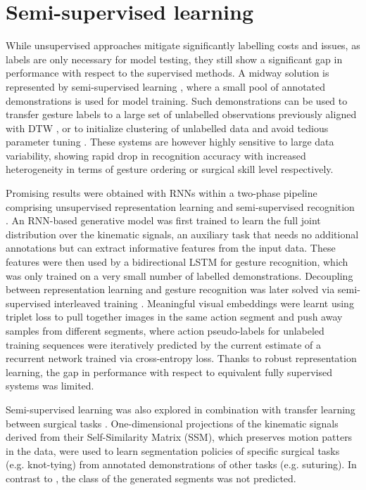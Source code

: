 \documentclass[journal]{IEEEtran}
\begin{document}
\section{Semi-supervised learning} \label{Semi-supervised Learning}

While unsupervised approaches mitigate significantly labelling costs and issues, as labels are only necessary for model testing, they still show a significant gap in performance with respect to the supervised methods. 
A midway solution is represented by semi-supervised learning \cite{Gao2016align, vanAmsterdam2019, DiPietro2019one, Tsai2019}, where a small pool of annotated demonstrations is used for model training. Such demonstrations can be used to transfer gesture labels to a large set of unlabelled observations previously aligned with DTW \cite{Gao2016align}, or to initialize clustering of unlabelled data and avoid tedious parameter tuning \cite{vanAmsterdam2019}. These systems are however highly sensitive to large data variability, showing rapid drop in recognition accuracy with increased heterogeneity in terms of gesture ordering or surgical skill level respectively.

Promising results were obtained with RNNs within a two-phase pipeline comprising unsupervised representation learning and semi-supervised recognition \cite{DiPietro2019one}.
An RNN-based generative model was first trained to learn the full joint distribution over the kinematic signals, an auxiliary task that needs no additional annotations but can extract informative features from the input data. 
These features were then used by a bidirectional LSTM for gesture recognition, which was only trained on a very small number of labelled demonstrations.
Decoupling between representation learning and gesture recognition was later solved via semi-supervised interleaved training \cite{Tanwani2020}.
Meaningful visual embeddings were learnt using triplet loss to pull together images in the same action segment and push away samples from different segments, where action pseudo-labels for unlabeled training sequences were iteratively predicted by the current estimate of a recurrent network trained via cross-entropy loss. 
Thanks to robust representation learning, the gap in performance with respect to equivalent fully supervised systems was limited.

Semi-supervised learning was also explored in combination with transfer learning between surgical tasks \cite{Tsai2019}. One-dimensional projections of the kinematic signals derived from their Self-Similarity Matrix (SSM), which preserves motion patters in the data, were used to learn segmentation policies of specific surgical tasks (e.g. knot-tying) from annotated demonstrations of other tasks (e.g. suturing). In contrast to \cite{Gao2016align, vanAmsterdam2019, DiPietro2019one}, the class of the generated segments was not predicted.
\end{document}
